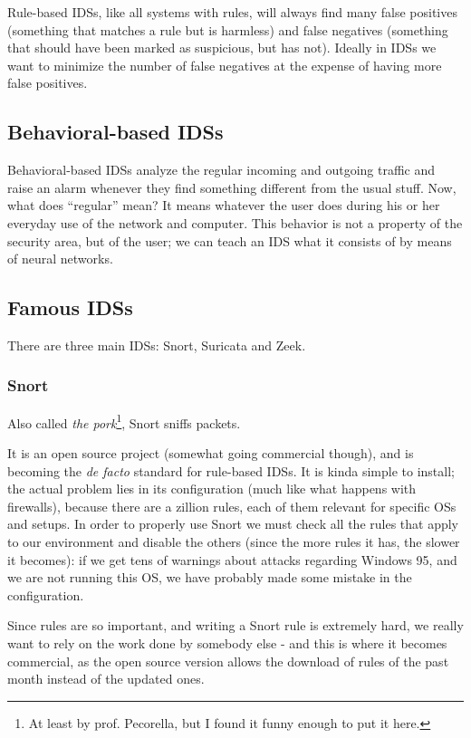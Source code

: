 Rule-based IDSs, like all systems with rules, will always find many false positives (something that matches a rule but is harmless) and false negatives (something that should have been marked as suspicious, but has not). Ideally in IDSs we want to minimize the number of false negatives at the expense of having more false positives.


\subsection{Behavioral-based IDSs} 
Behavioral-based IDSs analyze the regular incoming and outgoing traffic and raise an alarm whenever they find something different from the usual stuff. Now, what does “regular” mean? It means whatever the user does during his or her everyday use of the network and computer. This behavior is not a property of the security area, but of the user; we can teach an IDS what it consists of by means of neural networks.


\subsection{Famous IDSs}
There are three main IDSs: Snort, Suricata and Zeek.


\subsubsection*{Snort}
Also called \textit{the pork}\footnote{At least by prof. Pecorella, but I found it funny enough to put it here.}, Snort sniffs packets.

It is an open source project (somewhat going commercial though), and is becoming the \textit{de facto} standard for rule-based IDSs. It is kinda simple to install; the actual problem lies in its configuration (much like what happens with firewalls), because there are a zillion rules, each of them relevant for specific OSs and setups. In order to properly use Snort we must check all the rules that apply to our environment and disable the others (since the more rules it has, the slower it becomes): if we get tens of warnings about attacks regarding Windows 95, and we are not running this OS, we have probably made some mistake in the configuration.

Since rules are so important, and writing a Snort rule is extremely hard, we really want to rely on the work done by somebody else - and this is where it becomes commercial, as the open source version allows the download of rules of the past month instead of the updated ones.


